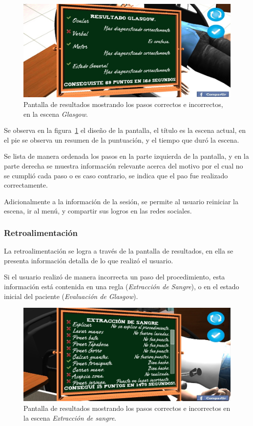 \begin{figure}[H]
\centering
\includegraphics[scale=0.5]{propuesta/resultado_glasgow.jpg}
\caption{Pantalla de resultados mostrando los pasos correctos e incorrectos, en
    la escena \emph{Glasgow}.}
\label{fig:resultados_glasgow}
\end{figure}

Se observa en la figura~\ref{fig:resultados_glasgow} el diseño de la
pantalla, el título es la escena actual, en el pie se observa un resumen de la
puntuación, y el tiempo que duró la escena.

Se lista de manera ordenada los pasos en la parte izquierda de la pantalla, y en
la parte derecha se muestra información relevante acerca del motivo por el cual
no se cumplió cada paso o es caso contrario, se indica que el pao fue realizado 
correctamente.

Adicionalmente a la información de la sesión, se permite al usuario reiniciar la
escena, ir al menú, y compartir sus logros en las redes sociales.

\subsubsection{Retroalimentación}

La retroalimentación se logra a través de la pantalla de resultados, en ella se
presenta información detalla de lo que realizó el usuario. 

Si el usuario realizó de manera incorrecta un paso del procedimiento, esta
información está contenida en una regla (\emph{Extracción de Sangre}), o en el
estado inicial del paciente (\emph{Evaluación de Glasgow}).

\begin{figure}[H]
\centering
\includegraphics[scale=0.5]{propuesta/resultado_hemocultivo.jpg}
\caption{Pantalla de resultados mostrando los pasos correctos e incorrectos en
    la escena \emph{Extracción de sangre}.}
\label{fig:resultados_hemocultivo}
\end{figure}

